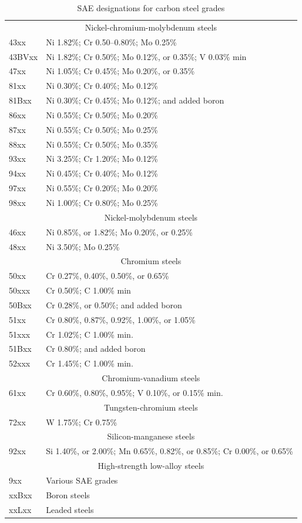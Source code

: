 \documentclass[
10pt,
a4paper,
openany,
svgnames,
]{book}
\begin{document}
\begin{table}[h]
\begin{tabular}{ll}
    \multicolumn{2}{c}{Nickel-chromium-molybdenum steels} \\
    43xx & Ni 1.82\%; Cr 0.50–0.80\%; Mo 0.25\% \\
    43BVxx & Ni 1.82\%; Cr 0.50\%; Mo 0.12\%, or 0.35\%; V 0.03\% min \\
    47xx & Ni 1.05\%; Cr 0.45\%; Mo 0.20\%, or 0.35\% \\
    81xx & Ni 0.30\%; Cr 0.40\%; Mo 0.12\% \\
    81Bxx & Ni 0.30\%; Cr 0.45\%; Mo 0.12\%; and added boron \cite{bringas2004handbook} \\
    86xx & Ni 0.55\%; Cr 0.50\%; Mo 0.20\% \\
    87xx & Ni 0.55\%; Cr 0.50\%; Mo 0.25\% \\
    88xx & Ni 0.55\%; Cr 0.50\%; Mo 0.35\% \\
    93xx & Ni 3.25\%; Cr 1.20\%; Mo 0.12\% \\
    94xx & Ni 0.45\%; Cr 0.40\%; Mo 0.12\% \\
    97xx & Ni 0.55\%; Cr 0.20\%; Mo 0.20\% \\
    98xx & Ni 1.00\%; Cr 0.80\%; Mo 0.25\% \\
    \multicolumn{2}{c}{Nickel-molybdenum steels} \\
    46xx & Ni 0.85\%, or 1.82\%; Mo 0.20\%, or 0.25\% \\
    48xx & Ni 3.50\%; Mo 0.25\% \\
    \multicolumn{2}{c}{Chromium steels} \\
    50xx & Cr 0.27\%, 0.40\%, 0.50\%, or 0.65\% \\
    50xxx & Cr 0.50\%; C 1.00\% min \\
    50Bxx & Cr 0.28\%, or 0.50\%; and added boron \cite{bringas2004handbook} \\
    51xx & Cr 0.80\%, 0.87\%, 0.92\%, 1.00\%, or 1.05\% \\
    51xxx & Cr 1.02\%; C 1.00\% min. \\
    51Bxx & Cr 0.80\%; and added boron \cite{bringas2004handbook} \\
    52xxx & Cr 1.45\%; C 1.00\% min. \\
    \multicolumn{2}{c}{Chromium-vanadium steels} \\
    61xx & Cr 0.60\%, 0.80\%, 0.95\%; V 0.10\%, or 0.15\% min. \\
    \multicolumn{2}{c}{Tungsten-chromium steels} \\
    72xx & W 1.75\%; Cr 0.75\% \\
    \multicolumn{2}{c}{Silicon-manganese steels} \\
    92xx & Si 1.40\%, or 2.00\%; Mn 0.65\%, 0.82\%, or 0.85\%; Cr 0.00\%, or 0.65\% \\
    \multicolumn{2}{c}{High-strength low-alloy steels} \\
    9xx & Various SAE grades \\
    xxBxx & Boron steels \\
    xxLxx & Leaded steels \\
    \bottomrule
  \end{tabular}
  \caption{SAE designations for carbon steel grades \cite{oberg2016machinery}}
\end{table}

\nocite{*}

\backmatter

\printbibliography[heading=bibintoc]
\end{document}
